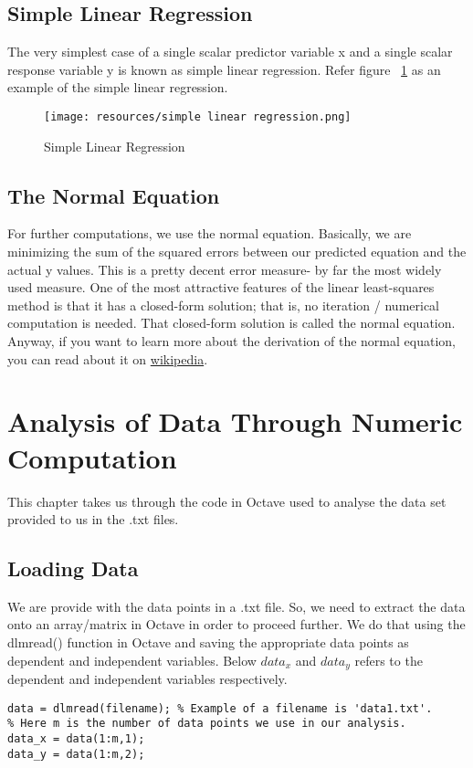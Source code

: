 \documentclass[a4paper, 12pt]{report}
\begin{document}
\section{Simple Linear Regression}
The very simplest case of a single scalar predictor variable x and a single scalar response variable y is known as simple linear regression. Refer figure ~\ref{fig:SLR} as an example of the simple linear regression.
\begin{figure}[!t]
    \centering
    \texttt{[image: resources/simple linear regression.png]}
    \caption{Simple Linear Regression}
    \label{fig:SLR}
\end{figure}
\section{The Normal Equation}
For further computations, we use the normal equation. Basically, we are minimizing the sum of the squared errors between our predicted equation and the actual y values. This is a pretty decent error measure- by far the most widely used measure. One of the most attractive features of the linear least-squares method is that it has a closed-form solution; that is, no iteration / numerical computation is needed. That closed-form solution is called the normal equation. Anyway, if you want to learn more about the derivation of the normal equation, you can read about it on \href{https://en.wikipedia.org/wiki/Linear_least_squares#Derivation_of_the_normal_equations}{wikipedia}.

 \chapter{ Analysis of Data Through Numeric Computation}
This chapter takes us through the code in Octave used to analyse the data set provided to us in the .txt files.
\section{Loading Data}
We are provide with the data points in a .txt file. So, we need to extract the data onto an array/matrix in Octave in order to proceed further. We do that using the dlmread() function in Octave and saving the appropriate data points as dependent and independent variables. Below $data_x$ and $data_y$ refers to the dependent and independent variables respectively.
\begin{lstlisting}[caption={Loading Data}]
data = dlmread(filename); % Example of a filename is 'data1.txt'.
% Here m is the number of data points we use in our analysis.
data_x = data(1:m,1);
data_y = data(1:m,2);
\end{lstlisting}
\end{document}

